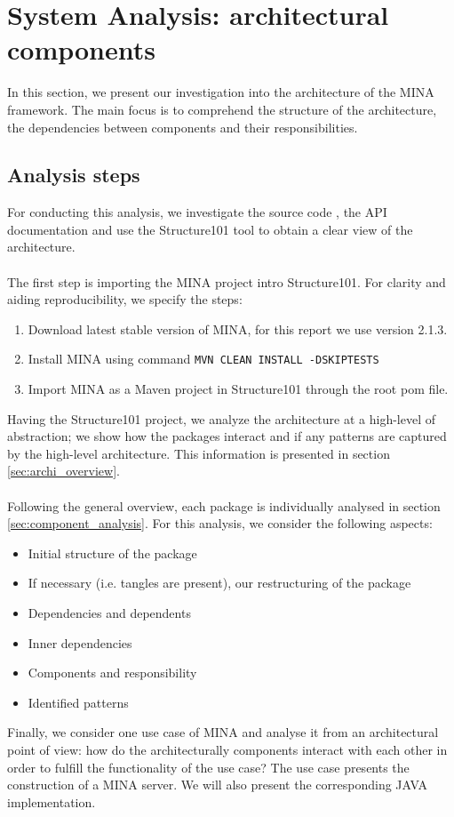 \section{System Analysis: architectural components}
\label{sec:analysis_components}
In this section, we present our investigation into the architecture of the MINA framework. The main focus is to comprehend the structure of the architecture, the dependencies between components and their responsibilities. 
\subsection{Analysis steps}
For conducting this analysis, we investigate the source code \cite{mina-github}, the API documentation \cite{mina-reference} and use the Structure101 tool \cite{structure101} to obtain a clear view of the architecture.\\\\
The first step is importing the MINA project intro Structure101. For clarity and aiding reproducibility, we specify the steps:
\begin{enumerate}
    \item Download latest stable version of MINA, for this report we use version 2.1.3.
    \item Install MINA using command \texttt{MVN CLEAN INSTALL -DSKIPTESTS}
    \item Import MINA as a Maven project in Structure101 through the root pom file.
\end{enumerate}
Having the Structure101 project, we analyze the architecture at a high-level of abstraction; we show how the packages interact and if any patterns are captured by the high-level architecture. This information is presented in section \ref{sec:archi_overview}.\\\\
Following the general overview, each package is individually analysed in section \ref{sec:component_analysis}. For this analysis, we consider the following aspects:
\begin{itemize}
    \item Initial structure of the package
    \item If necessary (i.e. tangles are present), our restructuring of the package
    \item Dependencies and dependents
    \item Inner dependencies
    \item Components and responsibility
    \item Identified patterns
    
\end{itemize}
Finally, we consider one use case of MINA and analyse it from an architectural point of view: how do the architecturally components interact with each other in order to fulfill the functionality of the use case? The use case presents the construction of a MINA server. We will also present the corresponding JAVA implementation.


